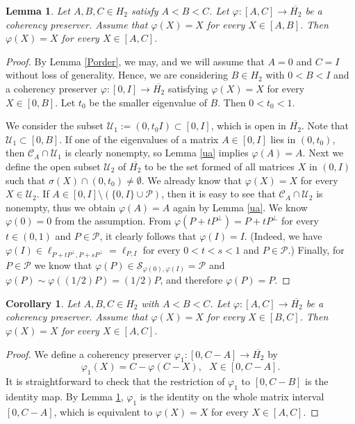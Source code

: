 \documentclass[10pt]{amsart}
\newtheorem{lemma}[theorem]{Lemma}
\newtheorem{corollary}[theorem]{Corollary}
\theoremstyle{definition}
\theoremstyle{remark}
\numberwithin{subsection}{section}
\numberwithin{equation}{section}
\newcommand\cP{{\mathcal{P}}}
\newcommand\oH{{\overline{H_2}}}
\begin{document}
\begin{lemma}\label{smtq}
Let $A,B,C \in H_2$ satisfy $A < B < C$. Let $\varphi \colon [A,C ] \to \oH$ be a coherency preserver. Assume that $\varphi (X) = X$ for every $X \in [A,B]$. Then $\varphi (X) = X$ for every $X \in [A,C]$.
\end{lemma}
\begin{proof}
By Lemma \ref{Porder}, we may, and we will assume that $A=0$ and $C= I$ without loss of generality.
Hence, we are considering $B \in H_2$ with $0 < B <  I$ and a coherency preserver $\varphi \colon [0,I ] \to \oH$ satisfying $\varphi (X) = X$ for every $X \in [0,B]$.
Let $t_0$ be the smaller eigenvalue of $B$. Then $0 < t_0 <1$. 

We consider the subset $\mathcal{U}_1:=(0, t_0I)\subset [0, I]$, which is open in $\oH$. 
Note that $\mathcal{U}_1\subset [0,B]$.
If one of the eigenvalues of a matrix $A\in [0, I]$ lies in $(0, t_0)$, then $\mathcal{C}_A\cap \mathcal{U}_1$ is clearly nonempty, so Lemma \ref{ua} implies $\varphi(A)=A$. 
Next we define the open subset $\mathcal{U}_2$ of $\oH$ to be the set formed of all matrices $X$ in $(0, I)$ such that $\sigma(X)\cap (0, t_0)\neq \emptyset$.
We already know that $\varphi(X)=X$ for every $X\in \mathcal{U}_2$. 
If $A\in [0, I]\setminus (\{0, I\} \cup \mathcal{P})$, then it is easy to see that $\mathcal{C}_A\cap \mathcal{U}_2$ is nonempty, thus we obtain $\varphi(A)=A$ again by Lemma \ref{ua}.
We know $\varphi(0)=0$ from the assumption.
From $\varphi(P+tP^\perp)=P+tP^\perp$ for every $t\in (0, 1)$ and $P\in \mathcal{P}$,  it clearly follows that $\varphi(I)=I$. (Indeed, we have $\varphi(I)\in \ell_{P+tP^\perp, P+sP^\perp} = \ell_{P, I}$ for every $0<t<s<1$ and $P\in \cP$.) Finally, for $P \in \mathcal{P}$ we know that $\varphi (P) \in {\mathcal{S}}_{\varphi(0), \varphi(I)}= \mathcal{P}$ and $\varphi(P) \sim \varphi((1/2)P)=(1/2)P$, and therefore $\varphi (P) =P$.
\end{proof}

\begin{corollary}\label{smtq1}
Let $A,B,C \in H_2$ with $A < B < C$. Let $\varphi \colon [A,C ] \to \oH$ be a coherency preserver. Assume that $\varphi (X) = X$ for every $X \in [B,C]$. Then $\varphi (X) = X$ for every $X \in [A,C]$.
\end{corollary}

\begin{proof}
We define a coherency preserver $\varphi_1 \colon [0, C-A] \to \oH$ by
\[
\varphi_1 (X) = C - \varphi (C-X), \ \ \ X \in [0, C-A].
\]
It is straightforward to check that the restriction of $\varphi_1$ to $[0, C-B]$ is the identity map. By Lemma \ref{smtq}, $\varphi_1$ is the identity on the whole matrix interval $[0, C-A]$, which is equivalent to $\varphi (X) = X$ for every $X \in [A,C]$.
\end{proof}
\end{document}
